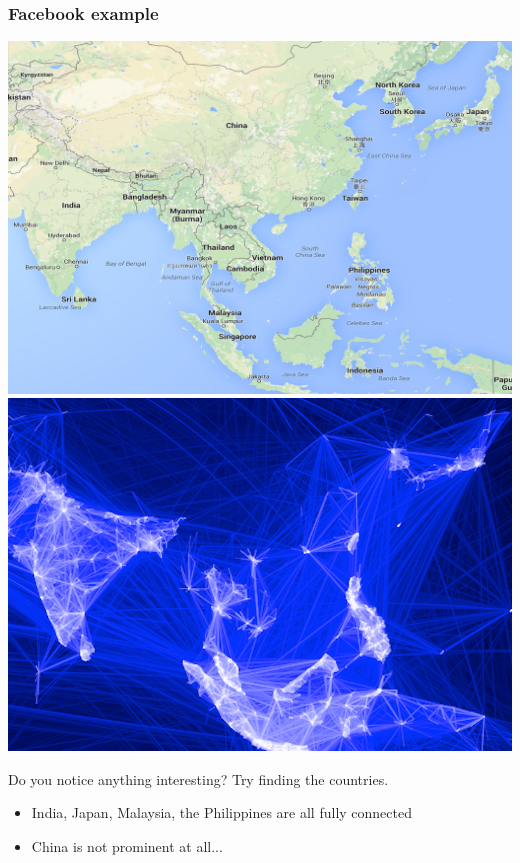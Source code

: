 \documentclass{beamer} %
\newcommand{\1}{\mathbb{1}}
\begin{document}
\begin{frame}[t]\frametitle{Facebook example}
\begin{center}
		\includegraphics[scale = 0.22]{./visualization/SEAsia_map.png}
		\includegraphics[scale = 0.22]{./visualization/SEAsia_fb.png}
	\end{center}
	Do you notice anything interesting? Try finding the countries.
	\begin{itemize}
		\item India, Japan, Malaysia, the Philippines are all fully connected
		\item China is not prominent at all... %
	\end{itemize}
\end{frame}
\end{document}
